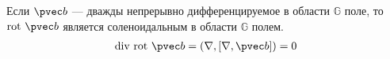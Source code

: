 \begin{example}
  Если $\pvec b$ --- дважды непрерывно дифференцируемое в области $\mathbb{G}$
  поле, то $\mbox{rot} \ \pvec b$ является соленоидальным в области
  $\mathbb{G}$ полем.
  \begin{gather*}
    \mbox{div} \ \mbox{rot} \ \pvec b = (\nabla, [\nabla, \pvec b]) = 0
  \end{gather*}
\end{example}
